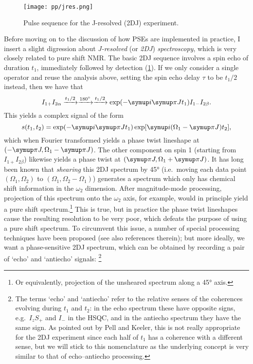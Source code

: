 \begin{figure}[htb]
    \centering
    \texttt{[image: pp/jres.png]}%
    \caption[2DJ pulse sequence]{Pulse sequence for the J-resolved (2DJ) experiment.}
    \label{fig:pp_jres}
\end{figure}

Before moving on to the discussion of how PSEs are implemented in practice, I insert a slight digression about \textit{J-resolved} (or \textit{2DJ}) \textit{spectroscopy}, which is very closely related to pure shift NMR.
The basic 2DJ sequence involves a spin echo of duration $t_1$, immediately followed by detection (\cref{fig:pp_jres}).
If we only consider a single operator and reuse the analysis above, setting the spin echo delay $\tau$ to be $t_1/2$ instead, then we have that
\begin{equation}
    \label{eq:2dj_operator_analysis}
    I_{1+}I_{2\alpha} \xrightarrow[]{t_1/2} \xrightarrow[]{\ang{180}} \xrightarrow[]{t_1/2} \exp(-\mi\cpi Jt_1) I_{1-}I_{2\beta}.
\end{equation}
This yields a complex signal of the form
\begin{equation}
    \label{eq:2dj_signal}
    s(t_1, t_2) = \exp(-\mi\cpi J t_1) \exp[\mi(\Omega_1 - \cpi J) t_2],
\end{equation}
which when Fourier transformed yields a phase twist lineshape at $(-\cpi J, \Omega_1 - \cpi J)$.
The other component on spin 1 (starting from $I_{1+}I_{2\beta}$) likewise yields a phase twist at $(\cpi J, \Omega_1 + \cpi J)$.
It has long been known that \textit{shearing} this 2DJ spectrum by \ang{45} (i.e.\ moving each data point $(\Omega_1, \Omega_2)$ to $(\Omega_1, \Omega_2 - \Omega_1)$) generates a spectrum which only has chemical shift information in the $\omega_2$ dimension.
After magnitude-mode processing, projection of this spectrum onto the $\omega_2$ axis, for example, would in principle yield a pure shift spectrum.\footnote{Or equivalently, projection of the unsheared spectrum along a \ang{45} axis\autocite{Aue1976JCP}.}
This is true, but in practice the phase twist lineshapes cause the resulting resolution to be very poor, which defeats the purpose of using a pure shift spectrum.
To circumvent this issue, a number of special processing techniques have been proposed\autocite{Xu1991JMR,Nuzillard1996JMRSA,Simova1997JMR} (see also references therein); but more ideally, we want a phase-sensitive 2DJ spectrum, which can be obtained by recording a pair of `echo' and `antiecho' signals:%
\footnote{The terms `echo' and `antiecho' refer to the relative senses of the coherences evolving during $t_1$ and $t_2$: in the echo spectrum these have opposite signs, e.g.\ $I_zS_+$ and $I_-$ in the HSQC, and in the antiecho spectrum they have the same sign. As pointed out by Pell and Keeler\autocite{Pell2007JMR}, this is not really appropriate for the 2DJ experiment since each half of $t_1$ has a coherence with a different sense, but we will stick to this nomenclature as the underlying concept is very similar to that of echo--antiecho processing.}
